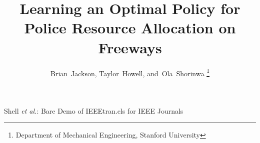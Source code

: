 \documentclass[10pt,journal]{IEEEtran}
\begin{document}
%
\title{Learning an Optimal Policy for Police Resource Allocation on Freeways}
%
%
%

\author{Brian~Jackson,
        Taylor~Howell,
        and~Ola~Shorinwa%
\thanks{Department of Mechanical Engineering, Stanford University}}

% 
%



%
{Shell \MakeLowercase{\textit{et al.}}: Bare Demo of IEEEtran.cls for IEEE Journals}
% 
\end{document}
